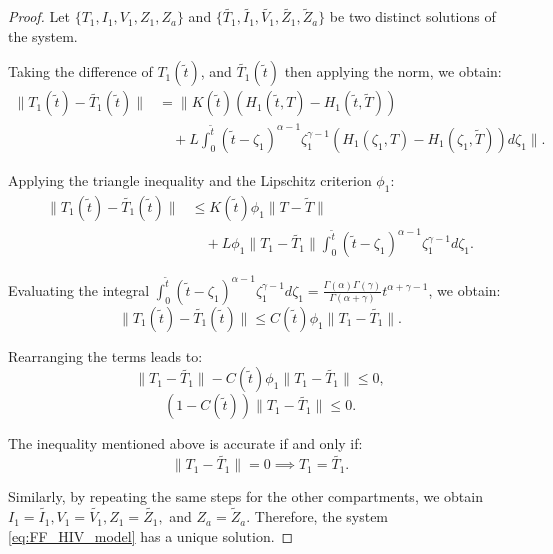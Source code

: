\documentclass[10pt,a4paper]{amsart}
\numberwithin{equation}{section}
\begin{document}
\begin{proof}
 Let $\{T_1, I_1, V_1, Z_1, Z_a\}$ and $\{\tilde{T_1}, \tilde{I_1}, \tilde{V_1}, \tilde{Z_1}, \tilde{Z}_a\}$ be two distinct solutions of the system. 
	
	Taking the difference of $T_1(\tilde{t})$, and $\tilde{T_1}(\tilde{t})$ then applying the norm, we obtain:
	\begin{align*}
		\|T_1(\tilde{t}) - \tilde{T_1}(\tilde{t})\| &= \Bigg\| K(\tilde{t}) \left( H_1(\tilde{t}, T) - H_1(\tilde{t}, \tilde{T}) \right) \\
		&\quad + L \int_0^{\tilde{t}} (\tilde{t}-\zeta_1)^{\alpha-1} \zeta_1^{\gamma-1} \left( H_1(\zeta_1, T) - H_1(\zeta_1, \tilde{T}) \right) d\zeta_1 \Bigg\|.
	\end{align*}
	
	Applying the triangle inequality and the Lipschitz criterion $\phi_1$:
	\begin{align*}
		\|T_1(\tilde{t}) - \tilde{T_1}(\tilde{t})\| &\leq K(\tilde{t}) \phi_1 \|T - \tilde{T}\| \\
		&\quad + L \phi_1 \|T_1 - \tilde{T_1}\| \int_0^{\tilde{t}} (\tilde{t}-\zeta_1)^{\alpha-1} \zeta_1^{\gamma-1} d\zeta_1.
	\end{align*}
	
	Evaluating the integral $\int_0^{\tilde{t}} (\tilde{t}-\zeta_1)^{\alpha-1} \zeta_1^{\gamma-1} d\zeta_1 = \frac{\Gamma(\alpha)\Gamma(\gamma)}{\Gamma(\alpha+\gamma)} t^{\alpha+\gamma-1}$, we obtain:
	\begin{equation*}
		\|T_1(\tilde{t}) - \tilde{T_1}(\tilde{t})\| \leq C(\tilde{t}) \phi_1 \|T_1 - \tilde{T_1}\|.
	\end{equation*}
	
	Rearranging the terms leads to:
	\begin{equation*}
		\|T_1 - \tilde{T_1}\| - C(\tilde{t}) \phi_1 \|T_1 - \tilde{T_1}\| \leq 0,
	\end{equation*}
	\begin{equation}
		( 1 - C(\tilde{t}) )\|T_1 - \tilde{T_1}\| \leq 0.
	\end{equation}
	
	The inequality mentioned above is accurate if and only if:
	\begin{equation*}
		\|T_1 - \tilde{T_1}\| = 0 \implies T_1 = \tilde{T_1}.
	\end{equation*}
	
	Similarly, by repeating the same steps for the other compartments, we obtain $I_1 = \tilde{I_1},V_1 = \tilde{V_1},Z_1 = \tilde{Z_1},$ and $Z_a = \tilde{Z}_a.$
	Therefore, the system \eqref{eq:FF_HIV_model} has a unique solution.
\end{proof}
\end{document}
